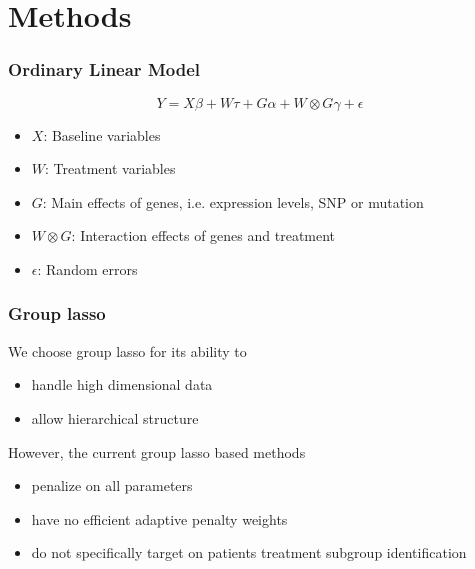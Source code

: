 \documentclass{beamer}
\begin{document}
    \section{Methods}
    
    \begin{frame}
    \frametitle{Ordinary Linear Model}
    
    $$Y=X\beta + W\tau + G\alpha + W\otimes G \gamma+\epsilon$$
    
    \begin{itemize}
        \item $X$: Baseline variables
        \item $W$: Treatment variables
        \item $G$: Main effects of genes, i.e. expression levels, SNP or mutation
        \item $W\otimes G$: Interaction effects of genes and treatment
        \item $\epsilon$: Random errors
    \end{itemize}
    \end{frame}
    
    \begin{frame}
    \frametitle{Group lasso}
    
    We choose group lasso for its ability to 
    
    \begin{itemize}
        \item handle high dimensional data
        \item allow hierarchical structure
    \end{itemize}
    
    However, the current group lasso based methods
    
    \begin{itemize}
        \item penalize on all parameters
        \item have no efficient adaptive penalty weights
        \item do not specifically target on patients treatment subgroup identification
    \end{itemize}
    
    \end{frame}
    
\end{document}
